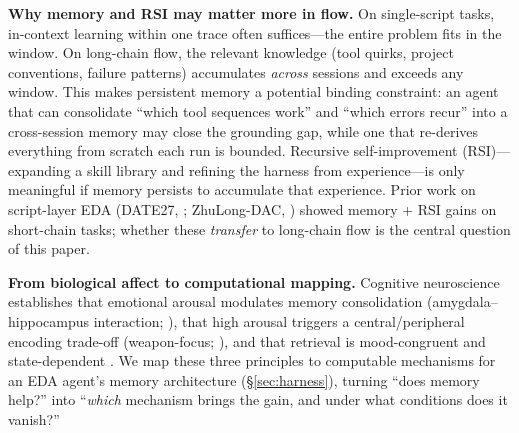 \textbf{Why memory and RSI may matter more in flow.} On single-script tasks, in-context learning within one trace often suffices---the entire problem fits in the window. On long-chain flow, the relevant knowledge (tool quirks, project conventions, failure patterns) accumulates \emph{across} sessions and exceeds any window. This makes persistent memory a potential binding constraint: an agent that can consolidate ``which tool sequences work'' and ``which errors recur'' into a cross-session memory may close the grounding gap, while one that re-derives everything from scratch each run is bounded. Recursive self-improvement (RSI)---expanding a skill library and refining the harness from experience---is only meaningful if memory persists to accumulate that experience. Prior work on script-layer EDA (DATE27, \cite{PLACEHOLDER_DATE27_ZHULONG}; ZhuLong-DAC, \cite{liu2026runreadbackrefine}) showed memory + RSI gains on short-chain tasks; whether these \emph{transfer} to long-chain flow is the central question of this paper.

\textbf{From biological affect to computational mapping.} Cognitive neuroscience establishes that emotional arousal modulates memory consolidation (amygdala--hippocampus interaction; \cite{mcgaugh2004}), that high arousal triggers a central/peripheral encoding trade-off (weapon-focus; \cite{loftus1987}), and that retrieval is mood-congruent and state-dependent \cite{bower1981}. We map these three principles to computable mechanisms for an EDA agent's memory architecture (\S\ref{sec:harness}), turning ``does memory help?'' into ``\emph{which} mechanism brings the gain, and under what conditions does it vanish?''
